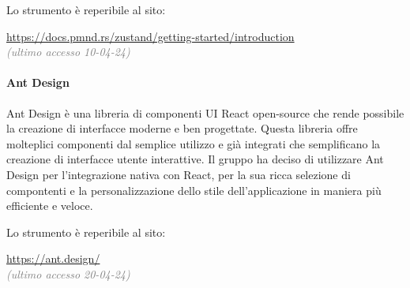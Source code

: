 \noindent Lo strumento è reperibile al sito:
\begin{center}
    \url{https://docs.pmnd.rs/zustand/getting-started/introduction}\\ \textcolor{gray}{\textit{(ultimo accesso 10-04-24)}}
\end{center}

\paragraph{Ant Design} \label{sec:processi_primari:sviluppo:strumenti:ant_design}
Ant Design è una libreria di componenti UI React open-source che rende possibile la creazione di interfacce moderne e ben progettate. Questa libreria offre molteplici componenti dal semplice utilizzo e già integrati che semplificano la creazione di interfacce utente interattive.
Il gruppo ha deciso di utilizzare Ant Design per l'integrazione nativa con React, per la sua ricca selezione di compontenti e la personalizzazione dello stile dell'applicazione in maniera più efficiente e veloce.
 
\noindent Lo strumento è reperibile al sito:
\begin{center}
    \url{https://ant.design/}\\ \textcolor{gray}{\textit{(ultimo accesso 20-04-24)}}
\end{center}

